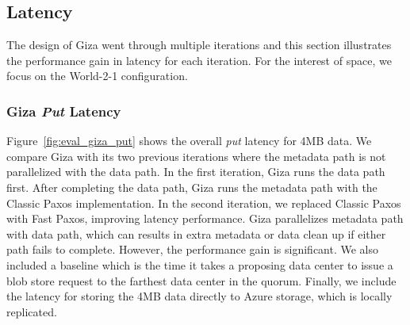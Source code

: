 

\subsection{\name Latency}

The design of Giza went through multiple iterations and this section illustrates
the performance gain in latency for each iteration. For the interest of space,
we focus on the World-2-1 configuration.

\subsubsection{Giza {\em Put} Latency}


Figure~\ref{fig:eval_giza_put} shows the \name overall {\em put} latency for 4MB
data. We compare Giza with its two previous iterations where the metadata path
is not parallelized with the data path. In the first iteration, Giza runs the
data path first. After completing the data path, Giza runs the metadata path
with the Classic Paxos implementation. In the second iteration, we replaced
Classic Paxos with Fast Paxos, improving latency performance. Giza parallelizes
metadata path with data path, which can results in extra metadata or data clean
up if either path fails to complete. However, the performance gain is
significant. We also included a baseline which is the time it takes a proposing
data center to issue a blob store request to the farthest data center in the
quorum. Finally, we include the latency for storing the 4MB data directly to
Azure storage, which is locally replicated.


